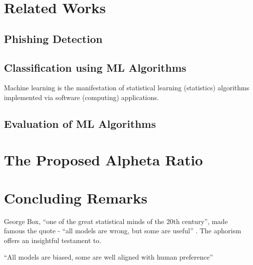 \documentclass[deca,blindrev]{informs3}
\begin{document}
\section{Related Works }

\subsection{Phishing Detection}

	\cite{Mohammad2015}
\subsection{Classification using ML Algorithms}

Machine learning is the manifestation of statistical learning (statistics) algorithms implemented via software (computing) applications.
\subsection{Evaluation of ML Algorithms}

\section {The Proposed Alpheta Ratio}

\section {Concluding Remarks}

George Box, ``one of the great statistical minds of the 20th century'',  made famous  the quote - ``all models are wrong, but some are useful'' \citep[p. 424]{box1987empirical}.  The aphorism offers an insightful testament to. 

``All models are biased, some are well aligned with human preference''


\ACKNOWLEDGMENT{%
}%
\end{document}
